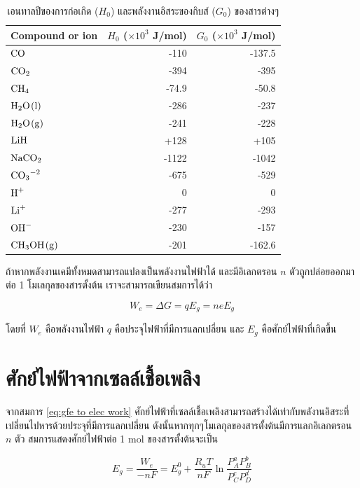 \documentclass[a4paper,nobib,openany,10pt]{tufte-book}
\begin{document}
\begin{table}[htbp]
\caption{\label{tab: enthalpy and gibbs free energy}เอนทาลปีของการก่อเกิด (\(H_0\)) และพลังงานอิสระของกิบส์ (\(G_0\)) ของสารต่างๆ}
\centering
\begin{tabular}{lrr}
\toprule
Compound or ion & \(H_0\) (\(\times 10^3\) J/mol) & \(G_0\) (\(\times 10^3\) J/mol)\\
\midrule
\(\ce{CO}\) & -110 & -137.5\\
\(\ce{CO2}\) & -394 & -395\\
\(\ce{CH4}\) & -74.9 & -50.8\\
\(\ce{H2O(l)}\) & -286 & -237\\
\(\ce{H2O(g)}\) & -241 & -228\\
\(\ce{LiH}\) & +128 & +105\\
\(\ce{NaCO2}\) & -1122 & -1042\\
\(\ce{CO3^{-2}}\) & -675 & -529\\
\(\ce{H^+}\) & 0 & 0\\
\(\ce{Li^+}\) & -277 & -293\\
\(\ce{OH^-}\) & -230 & -157\\
\(\ce{CH3OH(g)}\) & -201 & -162.6\\
\bottomrule
\end{tabular}
\end{table}

ถ้าหากพลังงานเคมีทั้งหมดสามารถแปลงเป็นพลังงานไฟฟ้าได้ และมีอิเลกตรอน
\(n\) ตัวถูกปล่อยออกมาต่อ 1 โมเลกุลของสารตั้งต้น
เราจะสามารถเขียนสมการได้ว่า

\begin{equation}
\label{eq:gfe to elec work}
  W_e= \Delta G = q E_g = ne E_g
\end{equation}

โดยที่ \(W_e\) คือพลังงานไฟฟ้า \(q\) คือประจุไฟฟ้าที่มีการแลกเปลี่ยน และ
\(E_g\) คือศักย์ไฟฟ้าที่เกิดขึ้น

\section{ศักย์ไฟฟ้าจากเซลล์เชื้อเพลิง}
\label{sec:org7b4cb02}
จากสมการ \ref{eq:gfe to elec work} ศักย์ไฟฟ้าที่เซลล์เชื้อเพลิงสามารถสร้างได้เท่ากับพลังานอิสระที่เปลี่ยนไปหารด้วยประจุที่มีการแลกเปลี่ยน ดังนั้นหากทุกๆโมเลกุลของสารตั้งต้นมีการแลกอิเลกตรอน \(n\) ตัว สมการแสดงศักย์ไฟฟ้าต่อ 1 mol ของสารตั้งต้นจะเป็น

\begin{equation}
\label{eq:orgfbbb6f4}
  E_g = \frac{W_e}{-nF} = E_g^0 + \frac{R_u T}{nF} \ln \frac{P_A^a P_B^b}{P_C^c P_D^d}
\end{equation}
\end{document}
